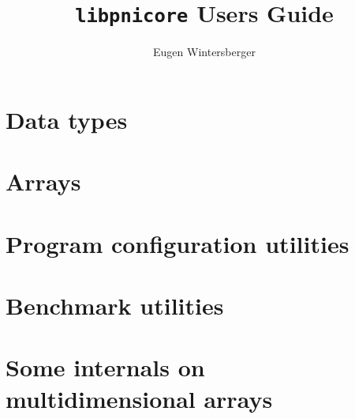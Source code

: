 \documentclass[a4paper]{scrbook}
\title{{\Huge{\tt libpnicore} Users Guide}}
\author{Eugen Wintersberger}
\begin{document}
\maketitle
\tableofcontents
\chapter{Data types}

\FloatBarrier

\chapter{Arrays}

\FloatBarrier

\chapter{Program configuration utilities}

\FloatBarrier

\chapter{Benchmark utilities}
\FloatBarrier

\appendix
\chapter{Some internals on multidimensional arrays}

\FloatBarrier
\end{document}
